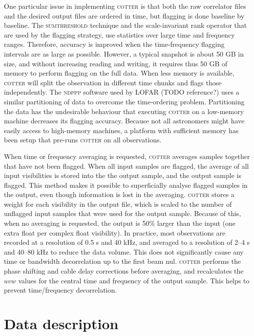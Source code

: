 \documentclass{pasa}
\begin{document}
One particular issue in implementing \textsc{cotter} is that both the raw correlator files and the desired output files are ordered in time, but flagging is done baseline by baseline. The \textsc{sumthreshold} technique and the scale-invariant rank operator that are used by the flagging strategy, use statistics over large time and frequency ranges. Therefore, accuracy is improved when the time-frequency flagging intervals are as large as possible. However, a typical snapshot is about 50 GB in size, and without increasing reading and writing, it requires thus 50 GB of memory to perform flagging on the full data. When less memory is available, \textsc{cotter} will split the observation in different time chunks and flags those independently. The \textsc{ndppp} software used by LOFAR (TODO reference?) uses a similar partitioning of data to overcome the time-ordering problem. Partitioning the data has the undesirable behaviour that executing \textsc{cotter} on a low-memory machine decreases its flagging accuracy. Because not all astronomers might have easily access to high-memory machines, a platform with sufficient memory has been setup that pre-runs \textsc{cotter} on all observations.

When time or frequency averaging is requested, \textsc{cotter} averages samples together that have not been flagged. When all input samples are flagged, the average of all input visibilities is stored into the the output sample, and the output sample is flagged. This method makes it possible to superficially analyse flagged samples in the output, even though information is lost in the averaging. \textsc{cotter} stores a weight for each visibility in the output file, which is scaled to the number of unflagged input samples that were used for the output sample. Because of this, when no averaging is requested, the output is 50\% larger than the input (one extra float per complex float visibility). In practice, most observations are recorded at a resolution of 0.5 s and 40 kHz, and averaged to a resolution of 2--4 s and 40--80 kHz to reduce the data volume. This does not significantly cause any time or bandwidth decorrelation up to the first beam nul. \textsc{cotter} performs the phase shifting and cable delay corrections before averaging, and recalculates the $uvw$ values for the central time and frequency of the output sample. This helps to prevent time/frequency decorrelation.

\section{Data description}
\end{document}
